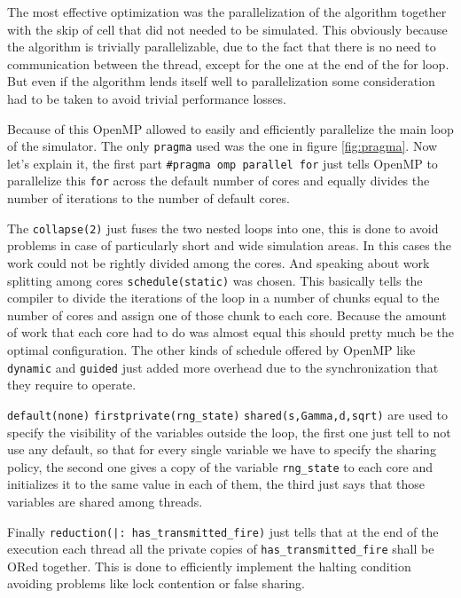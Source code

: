 \documentclass[Lau]{sapthesis} %
\begin{document}
The most effective optimization was the parallelization of the algorithm
together with the skip of cell that did not needed to be simulated. This
obviously because the algorithm is trivially parallelizable, due to the fact
that there is no need to communication between the thread, except for the one at
the end of the for loop. But even if the algorithm lends itself well to
parallelization some consideration had to be taken to avoid trivial performance
losses.

Because of this OpenMP allowed to easily and efficiently parallelize the main
loop of the simulator. The only \texttt{pragma} used was the one in figure
\ref{fig:pragma}. Now let's explain it, the first part \verb+#pragma omp parallel for+
just tells OpenMP to parallelize this \texttt{for} across the default number of
cores and equally divides the number of iterations to the number of default
cores.

The \texttt{collapse(2)} just fuses the two nested loops into one, this is done
to avoid problems in case of particularly short and wide simulation areas. In
this cases the work could not be rightly divided among the cores. And speaking
about work splitting among cores \texttt{schedule(static)} was chosen. This
basically tells the compiler to divide the iterations of the loop in a number of
chunks equal to the number of cores and assign one of those chunk to each core.
Because the amount of work that each core had to do was almost equal this should
pretty much be the optimal configuration. The other kinds of schedule offered by
OpenMP like \texttt{dynamic} and \texttt{guided} just added more overhead due to
the synchronization that they require to operate.

\verb+default(none)+ \verb+firstprivate(rng_state)+ \verb+shared(s,Gamma,d,sqrt)+
are used to specify the visibility of the variables outside the loop, the first
one just tell to not use any default, so that for every single variable we have
to specify the sharing policy, the second one gives a copy of the variable
\verb+rng_state+ to each core and initializes it to the same value in each of
them, the third just says that those variables are shared among threads.

Finally \verb+reduction(|: has_transmitted_fire)+ just tells that at the end of
the execution each thread all the private copies of \verb+has_transmitted_fire+
shall be ORed together. This is done to efficiently implement the halting
condition avoiding problems like lock contention or false sharing.
\end{document}
